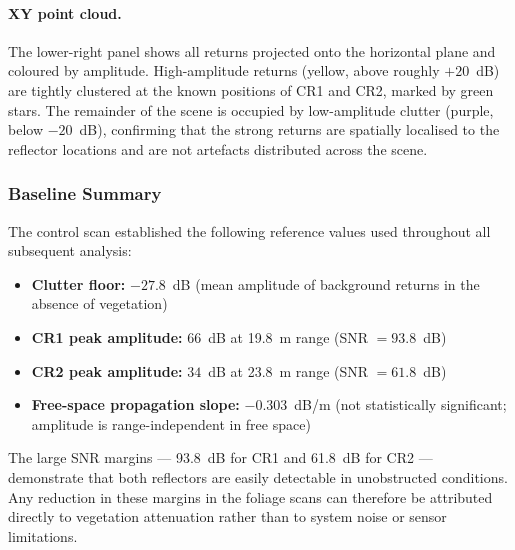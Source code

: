 \paragraph{XY point cloud.}
The lower-right panel shows all returns projected onto the horizontal plane and
coloured by amplitude.  High-amplitude returns (yellow, above roughly $+20$~dB)
are tightly clustered at the known positions of CR1 and CR2, marked by green stars.
The remainder of the scene is occupied by low-amplitude clutter (purple, below
$-20$~dB), confirming that the strong returns are spatially localised to the
reflector locations and are not artefacts distributed across the scene.


\subsubsection*{Baseline Summary}

The control scan established the following reference values used throughout all
subsequent analysis:

\begin{itemize}
  \item \textbf{Clutter floor:} $-27.8$~dB (mean amplitude of background returns
        in the absence of vegetation)
  \item \textbf{CR1 peak amplitude:} $66$~dB at 19.8~m range (SNR $= 93.8$~dB)
  \item \textbf{CR2 peak amplitude:} $34$~dB at 23.8~m range (SNR $= 61.8$~dB)
  \item \textbf{Free-space propagation slope:} $-0.303$~dB/m (not statistically
        significant; amplitude is range-independent in free space)
\end{itemize}

The large SNR margins — 93.8~dB for CR1 and 61.8~dB for CR2 — demonstrate that
both reflectors are easily detectable in unobstructed conditions.
Any reduction in these margins in the foliage scans can therefore be attributed
directly to vegetation attenuation rather than to system noise or sensor limitations.
